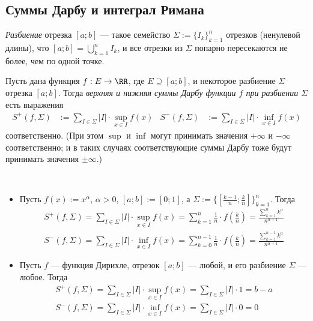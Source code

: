 \documentclass[12pt,a4paper]{article}
\begin{document}
    \subsection{Суммы Дарбу и интеграл Римана}

    \begin{definition}
        \emph{Разбиение} отрезка $[a; b]$ --- такое семейство $\Sigma := \{I_k\}_{k=1}^n$ отрезков (ненулевой длины), что $[a; b] = \bigcup_{k=1}^n I_k$, и все отрезки из $\Sigma$ попарно пересекаются не более, чем по одной точке.

        Пусть дана функция $f: E \to \RR$, где $E \supseteq [a; b]$, и некоторое разбиение $\Sigma$ отрезка $[a; b]$. Тогда \emph{верхняя и нижняя суммы Дарбу функции $f$ при разбиении $\Sigma$} есть выражения
        \begin{align*}
            S^+(f, \Sigma) &:= \sum_{I \in \Sigma} |I| \cdot \sup_{x \in I} f(x)&
            S^-(f, \Sigma) &:= \sum_{I \in \Sigma} |I| \cdot \inf_{x \in I} f(x)
        \end{align*}
        соответственно. (При этом $\sup$ и $\inf$ могут принимать значения $+\infty$ и $-\infty$ соответственно; и в таких случаях соответствующие суммы Дарбу тоже будут принимать значения $\pm \infty$.)
    \end{definition}

    \begin{example}\ 
        \begin{itemize}
            \item Пусть $f(x) := x^\alpha$, $\alpha > 0$, $[a; b] := [0; 1]$, а $\Sigma := \{[\frac{k-1}{n}; \frac{k}{n}]\}_{k=1}^n$. Тогда
                \begin{gather*}
                    S^+(f, \Sigma) = \sum_{I \in \Sigma} |I| \cdot \sup_{x \in I} f(x) = \sum_{k=1}^n \frac{1}{n} \cdot f\left(\frac{k}{n}\right) = \frac{\sum_{k=1}^n k^\alpha}{n^{\alpha + 1}}\\
                    S^-(f, \Sigma) = \sum_{I \in \Sigma} |I| \cdot \inf_{x \in I} f(x) = \sum_{k=0}^{n-1} \frac{1}{n} \cdot f\left(\frac{k}{n}\right) = \frac{\sum_{k=1}^{n-1} k^\alpha}{n^{\alpha + 1}}
                \end{gather*}

            \item Пусть $f$ --- функция Дирихле, отрезок $[a; b]$ --- любой, и его разбиение $\Sigma$ --- любое. Тогда
                \begin{gather*}
                    S^+(f, \Sigma) = \sum_{I \in \Sigma} |I| \cdot \sup_{x \in I} f(x) = \sum_{I \in \Sigma} |I| \cdot 1 = b - a\\
                    S^-(f, \Sigma) = \sum_{I \in \Sigma} |I| \cdot \inf_{x \in I} f(x) = \sum_{I \in \Sigma} |I| \cdot 0 = 0
                \end{gather*}
        \end{itemize}
    \end{example}
\end{document}
